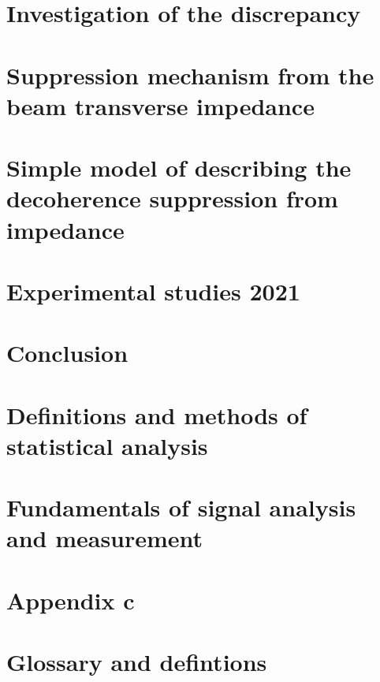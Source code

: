 \documentclass[12pt,twoside]{report} %
\begin{document}
%

\chapter{Investigation of the discrepancy}\label{Ch:investigating_discrepancy}


\chapter{Suppression mechanism from the beam transverse impedance}\label{Ch:suppression_impedances}\label{Ch:suppression_impedance}


\chapter{Simple model of describing the decoherence suppression from impedance}


\chapter{Experimental studies 2021}





\chapter{Conclusion}


\printglossaries
\appendix
\chapter{Definitions and  methods of statistical analysis}

\chapter{Fundamentals of signal analysis and measurement}\label{ch:app_B}

\chapter{Appendix c}\label{ch:app_B}

\chapter{Glossary and defintions}


\backmatter
\printbibliography
{}
\end{document}
